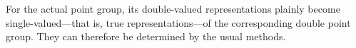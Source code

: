 For the actual point group, its double-valued representations plainly become
single-valued---that is, true representations---of the corresponding double
point group.  They can therefore be determined by the usual methods.
